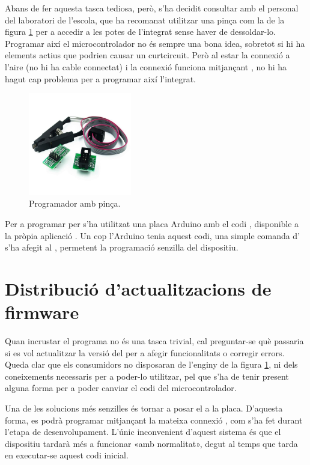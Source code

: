 Abans de fer aquesta tasca tediosa, però, s'ha decidit consultar amb el
personal del laboratori de l'escola, que ha recomanat utilitzar una pinça com
la de la figura \ref{fig:programmer} per a accedir a les potes de l'integrat sense haver
de dessoldar-lo. Programar així el microcontrolador no és sempre una bona idea,
sobretot si hi ha elements actius que podrien causar un curtcircuit. Però al estar
la connexió  a l'aire (no hi ha cable connectat) i la connexió
 funciona mitjançant , no hi ha hagut cap problema per
a programar així l'integrat.

\begin{figure}[ht]
    \centering
    \includegraphics[width=0.4\textwidth]{images/device/programmer.jpeg}
    \caption{Programador  amb pinça.}
    \label{fig:programmer}
\end{figure}

Per a programar per  s'ha utilitzat una placa Arduino amb el codi
, disponible a la pròpia aplicació 
\cite{ArduinoIsp}. Un cop
l'Arduino tenia aquest codi, una simple comanda d' s'ha afegit
al , permetent la programació senzilla del dispositiu.

\section{Distribució d'actualitzacions de firmware}

Quan incrustar el programa no és una tasca trivial, cal preguntar-se què
passaria si  es vol actualitzar la versió del  per a afegir
funcionalitats o corregir errors. Queda clar que els consumidors no disposaran
de l'enginy de la figura \ref{fig:programmer}, ni dels coneixements necessaris
per a poder-lo utilitzar, pel que s'ha de tenir present alguna forma per a
poder canviar el codi del microcontrolador.

Una de les solucions més senzilles és tornar a posar el  a la
placa. D'aquesta forma, es podrà programar mitjançant la mateixa connexió
, com s'ha fet durant l'etapa de desenvolupament. L'únic inconvenient
d'aquest sistema és que el dispositiu tardarà més a funcionar «amb normalitat»,
degut al temps que tarda en executar-se aquest codi inicial.

